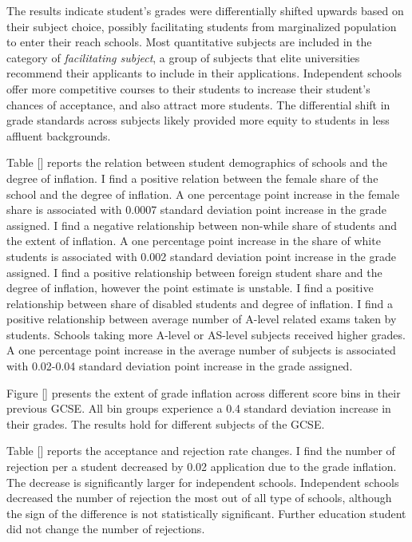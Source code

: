 The results indicate student's grades were differentially shifted upwards based on their subject choice, possibly facilitating students from marginalized population to enter their reach schools. Most quantitative subjects are included in the category of \emph{facilitating subject}, a group of subjects that elite universities recommend their applicants to include in their applications. Independent schools offer more competitive courses to their students to increase their student's chances of acceptance, and also attract more students. The differential shift in grade standards across subjects likely provided more equity to students in less affluent backgrounds. 

Table [] reports the relation between student demographics of schools and the degree of inflation. I find a positive relation between the female share of the school and the degree of inflation. A one percentage point increase in the female share is associated with 0.0007 standard deviation point increase in the grade assigned. I find a negative relationship between non-while share of students and the extent of inflation. A one percentage point increase in the share of white students is associated with 0.002 standard deviation point increase in the grade assigned. I find a positive relationship between foreign student share and the degree of inflation, however the point estimate is unstable. I find a positive relationship between share of disabled students and degree of inflation. I find a positive relationship between average number of A-level related exams taken by students. Schools taking more A-level or AS-level subjects received higher grades.  A one percentage point increase in the average number of subjects is associated with 0.02-0.04 standard deviation point increase in the grade assigned.

Figure [] presents the extent of grade inflation across different score bins in their previous GCSE. All bin groups experience a 0.4 standard deviation increase in their grades. The results hold for different subjects of the GCSE.

Table [] reports the acceptance and rejection rate changes. I find the number of rejection per a student decreased by 0.02 application due to the grade inflation. The decrease is significantly larger for independent schools. Independent schools decreased the number of rejection the most out of all type of schools, although the sign of the difference is not statistically significant. Further education student did not change the number of rejections.

